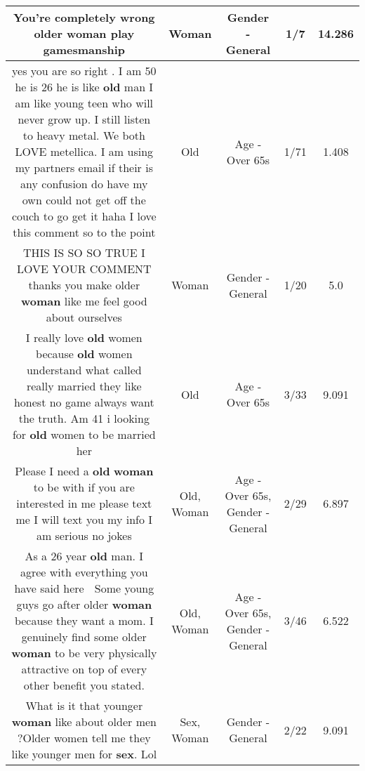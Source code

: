 \documentclass[11pt]{article}
\newlength\mylength
\begin{document}
\begin{center}
\begin{longtable}{|C{.65\mylength}|C{.30\mylength}|C{.12\mylength}|C{.12\mylength}|C{.12\mylength}|}
  \small You're completely wrong older \textbf{woman} play gamesmanship\normalsize   & Woman & Gender - General & 1/7 & 14.286 \\  \hline
  \small yes you are so right . I am 50 he is 26 he is like \textbf{old} man I am like young teen who will never grow up. I still listen to heavy metal. We both LOVE metellica. I am using my partners email if their is any confusion do have my own could not get off the couch to go get it haha I love this comment so to the point\normalsize   & Old & Age - Over 65s & 1/71 & 1.408 \\  \hline
  \small THIS IS SO SO TRUE I LOVE YOUR COMMENT thanks you make older \textbf{woman} like me feel good about ourselves\normalsize   & Woman & Gender - General & 1/20 & 5.0 \\  \hline
  \small I really love \textbf{old} women because \textbf{old} women understand what called really married they like honest no game always want the truth. Am 41 i looking for \textbf{old} women to be married her\normalsize   & Old & Age - Over 65s & 3/33 & 9.091 \\  \hline
  \small Please I need a \textbf{old} \textbf{woman} to be with if you are interested in me please text me I will text you my info I am serious no jokes\normalsize   & Old, Woman & Age - Over 65s, Gender - General & 2/29 & 6.897 \\  \hline
  \small As a 26 year \textbf{old} man. I agree with everything you have said here 👏 Some young guys go after older \textbf{woman} because they want a mom. I genuinely find some older \textbf{woman} to be very physically attractive on top of every other benefit you stated.\normalsize   & Old, Woman & Age - Over 65s, Gender - General & 3/46 & 6.522 \\  \hline
  \small What is it that younger \textbf{woman} like about  older men ?Older women  tell me they like younger men for \textbf{sex}. Lol\normalsize   & Sex, Woman & Gender - General & 2/22 & 9.091 \\  \hline

\end{longtable}
\end{center}
\end{document}
